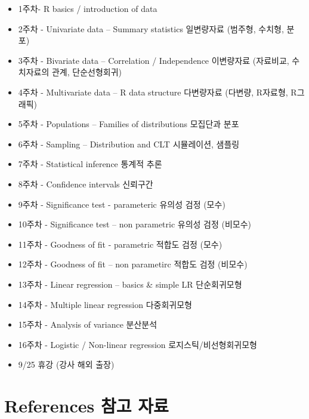 \documentclass[]{book}
\begin{document}
\begin{itemize}
\item
  1주차- R basics / introduction of data
\item
  2주차 - Univariate data -- Summary statistics 일변량자료 (범주형, 수치형, 분포)
\item
  3주차 - Bivariate data -- Correlation / Independence 이변량자료 (자료비교, 수치자료의 관계, 단순선형회귀)
\item
  4주차 - Multivariate data -- R data structure 다변량자료 (다변량, R자료형, R그래픽)
\item
  5주차 - Populations -- Families of distributions 모집단과 분포
\item
  6주차 - Sampling -- Distribution and CLT 시뮬레이션, 샘플링
\item
  7주차 - Statistical inference 통계적 추론
\item
  8주차 - Confidence intervals 신뢰구간
\item
  9주차 - Significance test - parameteric 유의성 검정 (모수)
\item
  10주차 - Significance test -- non parametric 유의성 검정 (비모수)
\item
  11주차 - Goodness of fit - parametric 적합도 검정 (모수)
\item
  12주차 - Goodness of fit -- non parametirc 적합도 검정 (비모수)
\item
  13주차 - Linear regression -- basics \& simple LR 단순회귀모형
\item
  14주차 - Multiple linear regression 다중회귀모형
\item
  15주차 - Analysis of variance 분산분석
\item
  16주차 - Logistic / Non-linear regression 로지스틱/비선형회귀모형
\item
  9/25 휴강 (강사 해외 출장)
\end{itemize}

\hypertarget{references---1}{%
\section{References 참고 자료}\label{references---1}}
\end{document}
